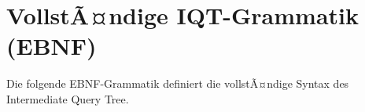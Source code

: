 ﻿%
\appendix
\section{VollstÃ¤ndige IQT-Grammatik (EBNF)}
\label{app:grammatik}

Die folgende EBNF-Grammatik definiert die vollstÃ¤ndige Syntax des
Intermediate Query Tree.

